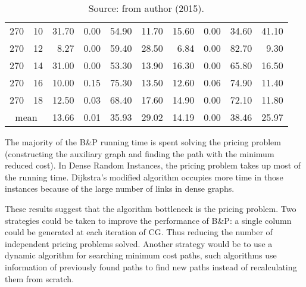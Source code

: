 \begin{table*}[h]
\begin{center}
\begin{tabular} {l l | r r r r | r r r r }
270  &             10  &  31.70  &            0.00             &               54.90  &  11.70  &  15.60  &            0.00             &               34.60  &  41.10  \\
270  &             12  &  8.27   &            0.00             &               59.40  &  28.50  &  6.84   &            0.00             &               82.70  &  9.30   \\
270  &             14  &  31.00  &            0.00             &               53.30  &  13.90  &  16.30  &            0.00             &               65.80  &  16.50  \\
270  &             16  &  10.00  &            0.15             &               75.30  &  13.50  &  12.60  &            0.06             &               74.90  &  11.40  \\
270  &             18  &  12.50  &            0.03             &               68.40  &  17.60  &  14.90  &            0.00             &               72.10  &  11.80  \\
\hline
\multicolumn{2}{c|}{mean} &  13.66  &            0.01             &               35.93  &  29.02  &  14.19  &            0.00             &               38.46  &  25.97  \\
\hline
\end{tabular}\caption*{Source: from author (2015).} 
\end{center}
\end{table*}

The majority of the B\&P running time is spent solving the pricing problem (constructing the auxiliary graph and finding the path with the minimum reduced cost).
In Dense Random Instances, the pricing problem takes up most of the running time. Dijkstra's modified algorithm occupies more time in those instances because of the large number of links in dense graphs.

These results suggest that the algorithm bottleneck is the pricing problem. Two strategies could be taken to improve the performance of B\&P: a single column could be generated at each iteration of CG. Thus reducing the number of independent pricing problems solved. Another strategy would be to use a dynamic algorithm for searching minimum cost paths, such algorithms use information of previously found paths to find new paths instead of recalculating them from scratch.
